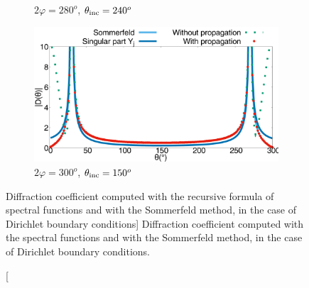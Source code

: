 \begin{figure}[h!]
\begin{subfigure}[b]{0.49\textwidth}
        \caption{$2\varphi = 280^o$, $\theta_{\rm inc} = 240^o$}
        \label{chapter5:figure12d}
    \end{subfigure}
\begin{subfigure}[b]{0.49\textwidth}
        \includegraphics[width=\textwidth]{images/chapter2/Figure8d.pdf}
        \caption{$2\varphi = 300^o$, $\theta_{\rm inc} = 150^o$}
        \label{chapter5:figure12c}
    \end{subfigure}
\caption
[Diffraction coefficient computed with the recursive formula of spectral functions and with the Sommerfeld method, in the case of Dirichlet boundary conditions]
{Diffraction  coefficient computed with the spectral functions and with the Sommerfeld method, in the case of Dirichlet boundary conditions.}
\label{chapter5:figure12}
\end{figure}

